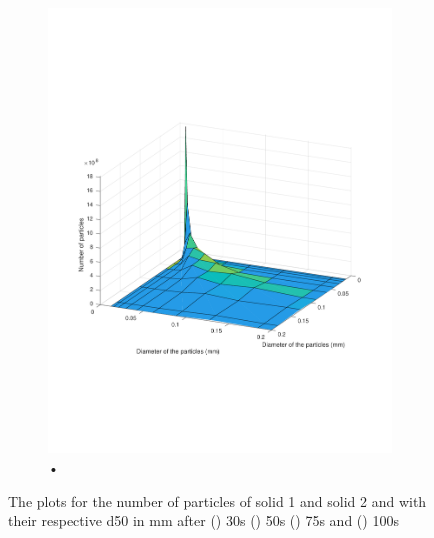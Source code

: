 \documentclass[preprint,11pt,authoryear]{elsarticle}
\begin{document}
\begin{figure}[H]
\begin{subfigure}{.5\textwidth}
\includegraphics[scale=0.45]{rslts:PBM_100s_psd.pdf}
\caption{•}
	\label{fig:100s}
\end{subfigure}
\caption{The plots for the number of particles of solid 1 and solid 2 and with their respective d50 in 
    mm after () 30s () 50s () 75s and () 
    100s}
\label{fig:rslts_PBM_d50_plots}
\end{figure}   
\end{document}
